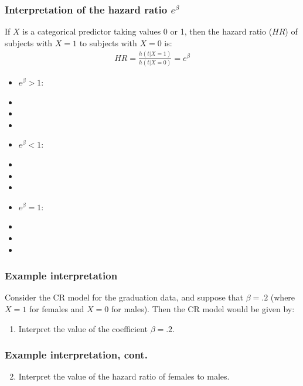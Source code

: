 \begin{frame}
\frametitle{Interpretation of the hazard ratio $e^\beta$}
\hspace*{-0.3in}
If $X$ is a categorical predictor taking values 0 or 1, then the hazard ratio ($HR$) of subjects with $X=1$ to subjects with $X=0$ is:
\emp
{}
\begin{eqnarray}
\boxed{HR = \frac{h(t|X=1)}{h(t|X=0)} = e^{\beta}} \nonumber
\end{eqnarray}
\emp
\begin{itemize}
\item $e^{\beta}>1$:
\item[]
\item[]
\item[]
\item $e^{\beta}<1$:
\item[]
\item[]
\item[]
\item $e^{\beta}=1$:
\item[]
\item[]
\item[]
\end{itemize}
\end{frame}

\begin{frame}
\frametitle{Example interpretation}
Consider the CR model for the graduation data, and suppose that $\beta=.2$ (where $X=1$ for females and $X=0$ for males).  Then the CR model would be given by:
\vskip40pt
\begin{enumerate}
\item Interpret the value of the coefficient $\beta=.2$.
\end{enumerate}
\vskip200pt
\end{frame}

\begin{frame}
\frametitle{Example interpretation, cont.}
\begin{enumerate}
\setcounter{enumi}{1}
\item Interpret the value of the hazard ratio of females to males.
\end{enumerate}
\vskip200pt
\end{frame}

